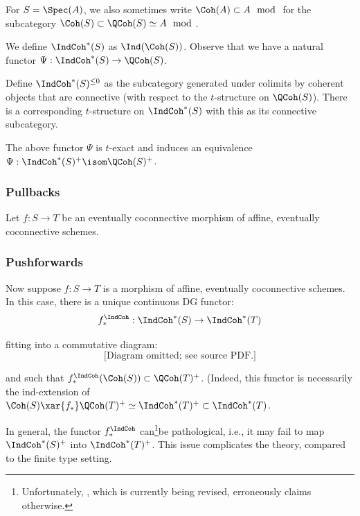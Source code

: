 \begin{notation}
\notready

For $S = \Spec(A)$, we also sometimes write $\Coh(A) \subset A\mod$ for
the subcategory $\Coh(S) \subset \QCoh(S) \simeq A\mod$.

\end{notation}

We define $\IndCoh^*(S)$ as $\Ind(\Coh(S))$.
Observe that we have a
natural functor $\Psi:\IndCoh^*(S) \to \QCoh(S)$.

Define $\IndCoh^*(S)^{\leq 0}$ as the subcategory generated
under colimits by coherent objects that are connective (with respect to the
$t$-structure on $\QCoh(S)$). There is a corresponding
$t$-structure on $\IndCoh^*(S)$ with this as its connective subcategory.

\begin{lem}
\notready\label{l:psi-affine}

The above functor $\Psi$ is $t$-exact and induces an equivalence
$\Psi:\IndCoh^*(S)^+ \isom \QCoh(S)^+$.

\end{lem}

\subsubsection{Pullbacks}

Let $f:S \to T$ be an eventually coconnective morphism of affine, eventually
coconnective schemes.


\subsubsection{Pushforwards}

Now suppose $f:S \to T$ is a morphism of affine, eventually coconnective schemes.
In this case, there is a unique continuous DG functor:
%
\[
f_*^{\IndCoh}:\IndCoh^*(S) \to \IndCoh^*(T)
\]

 fitting into a commutative diagram:
%
\[
\text{[Diagram omitted; see source PDF.]}
\]

 and such that $f_*^{\IndCoh}(\Coh(S)) \subset \QCoh(T)^+$.
(Indeed, this functor is necessarily the ind-extension of
$\Coh(S) \xar{f_*} \QCoh(T)^+ \simeq \IndCoh^*(T)^+ \subset \IndCoh^*(T)$.

In general, the functor $f_*^{\IndCoh}$ can\footnote{Unfortunately, \cite{methods}, which
is currently being revised, erroneously claims otherwise.}be pathological, i.e., it may fail to map $\IndCoh^*(S)^+$ into $\IndCoh^*(T)^+$.
This issue complicates the theory, compared to the finite type setting.

